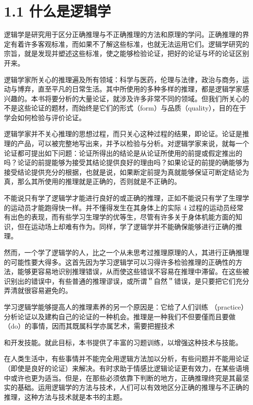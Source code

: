 \section*{1.1 什么是逻辑学}
逻辑学是研究用于区分正确推理与不正确推理的方法和原理的学问。正确推理的界定有着许多客观标准，而如果不了解这些标准，也就无法运用它们。逻辑学研究的宗旨，就是发现并塑述这些标准，使之能够检验论证，把好的论证与坏的论证区别开来。

逻辑学家所关心的推理遍及所有领域：科学与医药，伦理与法律，政治与商务，运动与博弃，直至平凡的日常生活。其中所使用的多种多样的推理，都是逻辑学家感兴趣的。本书将要分析的大量论证，就涉及许多非常不同的领域。但我们所关心的不是这些论证的题材，而始终是它们的形式（form）与品质（quality），目的在于学会如何检验与评价论证。

逻辑学家并不关心推理的思想过程，而只关心这种过程的结果，即论证。论证是推理的产品，可以被完整地写出来，并予以检验与分析。对逻辑学家来说，就每一个论证都可提出如下问题：论证所得出的结论是从论证所使用的前提或假定推出的吗？论证的前提能够为接受其结论提供良好的理由吗？如果论证的前提的确能够为接受结论提供充分的根据，也就是说，如果断定前提为真就能够保证可断定结论为真，那么其所使用的推理就是正确的，否则就是不正确的。

不能说只有学了逻辑学才能进行良好的或正确的推理，正如不能说只有学了生理学的运动员才能跑得快一样。并不懂得发生在其身体上的实际 4 过程的运动员经常有出色的表现，而有些学习生理学的优等生，尽管有许多关于身体机能方面的知识，但在运动场上却难有作为。同样，学了逻辑学并不能确保能够进行正确的推理。

然而，一个学了逻辑学的人，比之一个从未思考过推理原理的人，其进行正确推理的可能性要大得多。这首先因为学习逻辑学可以习得许多检验推理的正确性的方法，能够更容易地识别推理错误，从而使这些错误不容易在推理中滞留。在这些被识别出的错误中，有些普通的推理谬误，或所谓＂自然＂错误，是只要把它们充分弄清就很容易避免的。

学习逻辑学能够提高人的推理素养的另一个原因是：它给了人们训练 （practice）分析论证以及建构自己的论证的一种机会。推理是一种我们不但要僅而且要做（do）的事情，因而其既属科学亦属艺术，需要把握技术

和开发技能。就此目标，本书提供了丰富的习题训练，以增强这种技术与技能。

在人类生活中，有些事情并不能完全用逻辑方法加以分析，有些问题并不能用论证（即使是良好的论证）来解决。有时求助于情感比逻辑论证更有效力，在某些语境中或许也更为适当。但是，在那些必须依靠下判断的地方，正确推理终究是其最坚实的基础。运用逻辑学的方法与技术，人们可以有效地区分正确的推理与不正确的推理，这种方法与技术就是本书的主题。 